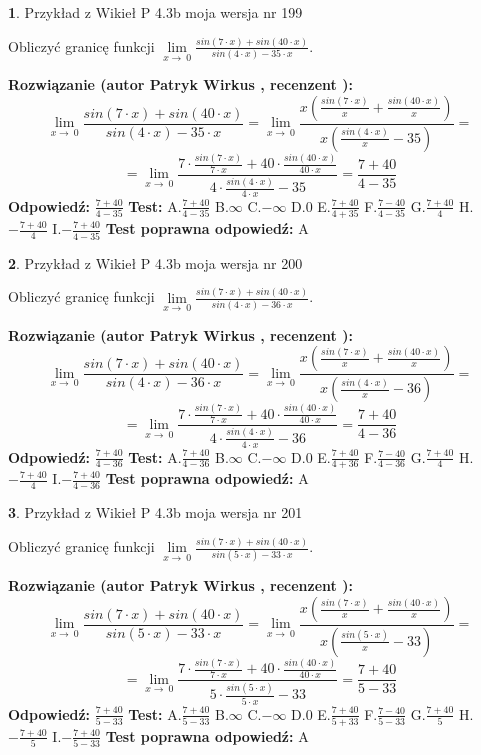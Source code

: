 \documentclass[12pt, a4paper]{article}
\theoremstyle{definition} %
\newtheorem{zad}{}
\newcommand{\zadStart}[1]{\begin{zad}#1\newline}
\newcommand{\zadStop}{\end{zad}}
\newcommand{\rozwStart}[2]{\noindent \textbf{Rozwiązanie (autor #1 , recenzent #2): }\newline}
\newcommand{\rozwStop}{\newline}
\newcommand{\odpStart}{\noindent \textbf{Odpowiedź:}\newline}
\newcommand{\odpStop}{\newline}
\newcommand{\testStart}{\noindent \textbf{Test:}\newline}
\newcommand{\testStop}{\newline}
\newcommand{\kluczStart}{\noindent \textbf{Test poprawna odpowiedź:}\newline}
\newcommand{\kluczStop}{\newline}
\begin{document}
\zadStart{Przykład z Wikieł P 4.3b moja wersja nr 199}


Obliczyć granicę funkcji $\lim\limits_{x\to\ 0}\frac{sin(7 \cdot x)+sin(40 \cdot x)}{sin(4 \cdot x)-35 \cdot x}$.
\zadStop
\rozwStart{Patryk Wirkus}{}
$$\lim\limits_{x\to\ 0}\frac{sin(7 \cdot x)+sin(40 \cdot x)}{sin(4 \cdot x)-35 \cdot x}=\lim\limits_{x\to\ 0}\frac{x(\frac{sin(7 \cdot x)}{x}+\frac{sin(40 \cdot x)}{x})}{x(\frac{sin(4 \cdot x)}{x}-35)}=$$
$$=\lim\limits_{x\to\ 0}\frac{7 \cdot \frac{sin(7 \cdot x)}{7 \cdot x}+40 \cdot \frac{sin(40 \cdot x)}{40 \cdot x}}{4 \cdot \frac{sin(4 \cdot x)}{4 \cdot x}-35}=\frac{7+40}{4-35}$$
\rozwStop
\odpStart
$\frac{7+40}{4-35}$
\odpStop
\testStart
A.$\frac{7+40}{4-35}$
B.$\infty$
C.$-\infty$
D.$0$
E.$\frac{7+40}{4+35}$
F.$\frac{7-40}{4-35}$
G.$\frac{7+40}{4}$
H.$-\frac{7+40}{4}$
I.$-\frac{7+40}{4-35}$
\testStop
\kluczStart
A
\kluczStop



\zadStart{Przykład z Wikieł P 4.3b moja wersja nr 200}


Obliczyć granicę funkcji $\lim\limits_{x\to\ 0}\frac{sin(7 \cdot x)+sin(40 \cdot x)}{sin(4 \cdot x)-36 \cdot x}$.
\zadStop
\rozwStart{Patryk Wirkus}{}
$$\lim\limits_{x\to\ 0}\frac{sin(7 \cdot x)+sin(40 \cdot x)}{sin(4 \cdot x)-36 \cdot x}=\lim\limits_{x\to\ 0}\frac{x(\frac{sin(7 \cdot x)}{x}+\frac{sin(40 \cdot x)}{x})}{x(\frac{sin(4 \cdot x)}{x}-36)}=$$
$$=\lim\limits_{x\to\ 0}\frac{7 \cdot \frac{sin(7 \cdot x)}{7 \cdot x}+40 \cdot \frac{sin(40 \cdot x)}{40 \cdot x}}{4 \cdot \frac{sin(4 \cdot x)}{4 \cdot x}-36}=\frac{7+40}{4-36}$$
\rozwStop
\odpStart
$\frac{7+40}{4-36}$
\odpStop
\testStart
A.$\frac{7+40}{4-36}$
B.$\infty$
C.$-\infty$
D.$0$
E.$\frac{7+40}{4+36}$
F.$\frac{7-40}{4-36}$
G.$\frac{7+40}{4}$
H.$-\frac{7+40}{4}$
I.$-\frac{7+40}{4-36}$
\testStop
\kluczStart
A
\kluczStop



\zadStart{Przykład z Wikieł P 4.3b moja wersja nr 201}


Obliczyć granicę funkcji $\lim\limits_{x\to\ 0}\frac{sin(7 \cdot x)+sin(40 \cdot x)}{sin(5 \cdot x)-33 \cdot x}$.
\zadStop
\rozwStart{Patryk Wirkus}{}
$$\lim\limits_{x\to\ 0}\frac{sin(7 \cdot x)+sin(40 \cdot x)}{sin(5 \cdot x)-33 \cdot x}=\lim\limits_{x\to\ 0}\frac{x(\frac{sin(7 \cdot x)}{x}+\frac{sin(40 \cdot x)}{x})}{x(\frac{sin(5 \cdot x)}{x}-33)}=$$
$$=\lim\limits_{x\to\ 0}\frac{7 \cdot \frac{sin(7 \cdot x)}{7 \cdot x}+40 \cdot \frac{sin(40 \cdot x)}{40 \cdot x}}{5 \cdot \frac{sin(5 \cdot x)}{5 \cdot x}-33}=\frac{7+40}{5-33}$$
\rozwStop
\odpStart
$\frac{7+40}{5-33}$
\odpStop
\testStart
A.$\frac{7+40}{5-33}$
B.$\infty$
C.$-\infty$
D.$0$
E.$\frac{7+40}{5+33}$
F.$\frac{7-40}{5-33}$
G.$\frac{7+40}{5}$
H.$-\frac{7+40}{5}$
I.$-\frac{7+40}{5-33}$
\testStop
\kluczStart
A
\kluczStop
\end{document}
